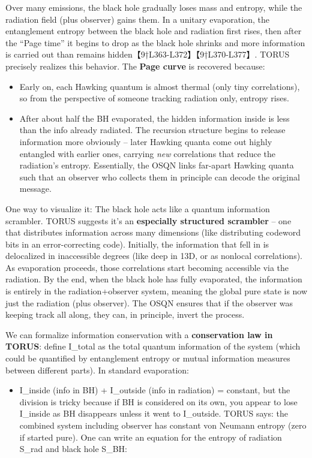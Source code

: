 \documentclass[]{article}
\begin{document}
Over many emissions, the black hole gradually loses mass and entropy,
while the radiation field (plus observer) gains them. In a unitary
evaporation, the entanglement entropy between the black hole and
radiation first rises, then after the ``Page time'' it begins to drop as
the black hole shrinks and more information is carried out than remains
hidden【9†L363-L372】【9†L370-L377】. TORUS precisely realizes this
behavior. The \textbf{Page curve} is recovered because:

\begin{itemize}
\item
  Early on, each Hawking quantum is almost thermal (only tiny
  correlations), so from the perspective of someone tracking radiation
  only, entropy rises.
\item
  After about half the BH evaporated, the hidden information inside is
  less than the info already radiated. The recursion structure begins to
  release information more obviously -- later Hawking quanta come out
  highly entangled with earlier ones, carrying \emph{new} correlations
  that reduce the radiation's entropy. Essentially, the OSQN links
  far-apart Hawking quanta such that an observer who collects them in
  principle can decode the original message.
\end{itemize}

One way to visualize it: The black hole acts like a quantum information
scrambler. TORUS suggests it's an \textbf{especially structured
scrambler} -- one that distributes information across many dimensions
(like distributing codeword bits in an error-correcting code).
Initially, the information that fell in is delocalized in inaccessible
degrees (like deep in 13D, or as nonlocal correlations). As evaporation
proceeds, those correlations start becoming accessible via the
radiation. By the end, when the black hole has fully evaporated, the
information is entirely in the radiation+observer system, meaning the
global pure state is now just the radiation (plus observer). The OSQN
ensures that if the observer was keeping track all along, they can, in
principle, invert the process.

We can formalize information conservation with a \textbf{conservation
law in TORUS}: define I\_total as the total quantum information of the
system (which could be quantified by entanglement entropy or mutual
information measures between different parts). In standard evaporation:

\begin{itemize}
\item
  I\_inside (info in BH) + I\_outside (info in radiation) = constant,
  but the division is tricky because if BH is considered on its own, you
  appear to lose I\_inside as BH disappears unless it went to
  I\_outside. TORUS says: the combined system including observer has
  constant von Neumann entropy (zero if started pure). One can write an
  equation for the entropy of radiation S\_rad and black hole S\_BH:
\end{itemize}
\end{document}
